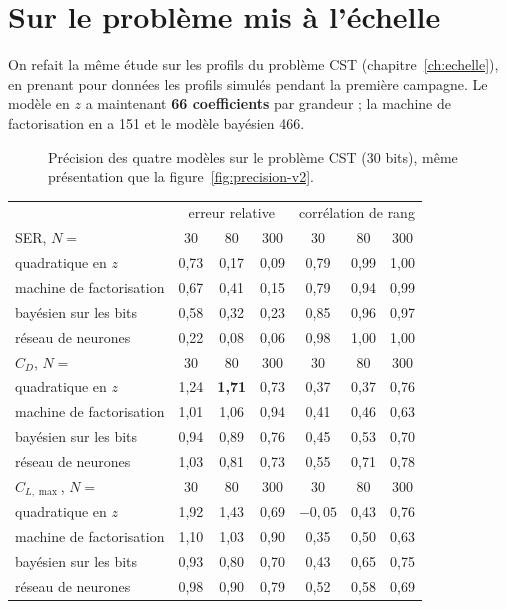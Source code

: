 \section{Sur le problème mis à l'échelle}
On refait la même étude sur les profils du problème CST (chapitre~\ref{ch:echelle}), en prenant pour données les profils simulés pendant la première campagne. Le modèle en $z$ a maintenant \textbf{66 coefficients} par grandeur ; la machine de factorisation en a 151 et le modèle bayésien 466.
\begin{figure}[htbp]
\centering

\caption{Précision des quatre modèles sur le problème CST (30 bits), même présentation que la figure~\ref{fig:precision-v2}.}\label{fig:precision-cst}
\end{figure}
\begin{center}
\renewcommand{\arraystretch}{1.2}
\small
\begin{tabular}{l ccc ccc}
\toprule
& \multicolumn{3}{c}{erreur relative} & \multicolumn{3}{c}{corrélation de rang} \\
SER, $N=$ & 30 & 80 & 300 & 30 & 80 & 300 \\
\midrule
quadratique en $z$ & 0,73 & 0,17 & 0,09 & 0,79 & 0,99 & 1,00 \\
machine de factorisation & 0,67 & 0,41 & 0,15 & 0,79 & 0,94 & 0,99 \\
bayésien sur les bits & 0,58 & 0,32 & 0,23 & 0,85 & 0,96 & 0,97 \\
réseau de neurones & 0,22 & 0,08 & 0,06 & 0,98 & 1,00 & 1,00 \\
\midrule
$C_D$, $N=$ & 30 & 80 & 300 & 30 & 80 & 300 \\
\midrule
quadratique en $z$ & 1,24 & \textbf{1,71} & 0,73 & 0,37 & 0,37 & 0,76 \\
machine de factorisation & 1,01 & 1,06 & 0,94 & 0,41 & 0,46 & 0,63 \\
bayésien sur les bits & 0,94 & 0,89 & 0,76 & 0,45 & 0,53 & 0,70 \\
réseau de neurones & 1,03 & 0,81 & 0,73 & 0,55 & 0,71 & 0,78 \\
\midrule
$C_{L,\max}$, $N=$ & 30 & 80 & 300 & 30 & 80 & 300 \\
\midrule
quadratique en $z$ & 1,92 & 1,43 & 0,69 & $-0{,}05$ & 0,43 & 0,76 \\
machine de factorisation & 1,10 & 1,03 & 0,90 & 0,35 & 0,50 & 0,63 \\
bayésien sur les bits & 0,93 & 0,80 & 0,70 & 0,43 & 0,65 & 0,75 \\
réseau de neurones & 0,98 & 0,90 & 0,79 & 0,52 & 0,58 & 0,69 \\
\bottomrule
\end{tabular}
\end{center}

